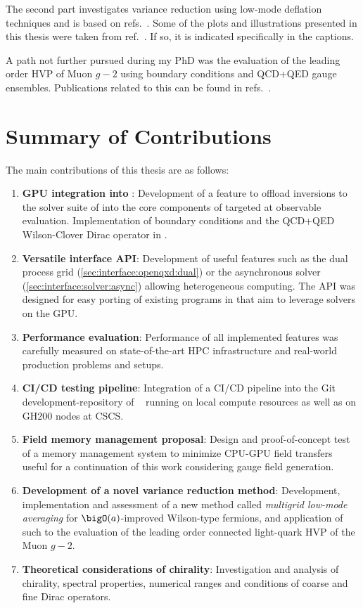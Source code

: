 The second part investigates variance reduction using low-mode deflation techniques and is based on refs.~.
Some of the plots and illustrations presented in this thesis were taken from ref.~.
If so, it is indicated specifically in the captions.

A path not further pursued during my PhD was the evaluation of the leading order HVP of Muon $g-2$ using \Cstar boundary conditions and QCD+QED gauge ensembles.
Publications related to this can be found in refs.~.



\section{Summary of Contributions}

The main contributions of this thesis are as follows:

\begin{enumerate}
   \item \textbf{GPU integration into \openqxd}: Development of a feature to offload inversions to the solver suite of \quda into the core components of \openqxd targeted at observable evaluation. Implementation of \Cstar boundary conditions and the QCD+QED Wilson-Clover Dirac operator in \quda.
   \item \textbf{Versatile interface API}: Development of useful features such as the dual process grid (\cref{sec:interface:openqxd:dual}) or the asynchronous solver (\cref{sec:interface:solver:async}) allowing heterogeneous computing. The API was designed for easy porting of existing programs in \openqxd that aim to leverage solvers on the GPU.
   \item \textbf{Performance evaluation}: Performance of all implemented features was carefully measured on state-of-the-art HPC infrastructure and real-world production problems and setups.
   \item \textbf{CI/CD testing pipeline}: Integration of a CI/CD pipeline into the Git development-repository of \openqxd~\cite{gitlab:openqxd-devel} running on local compute resources as well as on GH200 nodes at CSCS.
   \item \textbf{Field memory management proposal}: Design and proof-of-concept test of a memory management system to minimize CPU-GPU field transfers useful for a continuation of this work considering gauge field generation.
   \item \textbf{Development of a novel variance reduction method}: Development, implementation and assessment of a new method called \emph{multigrid low-mode averaging} for $\bigO(a)$-improved Wilson-type fermions, and application of such to the evaluation of the leading order connected light-quark HVP of the Muon $g-2$.
   \item \textbf{Theoretical considerations of chirality}: Investigation and analysis of chirality, spectral properties, numerical ranges and conditions of coarse and fine Dirac operators.
\end{enumerate}

